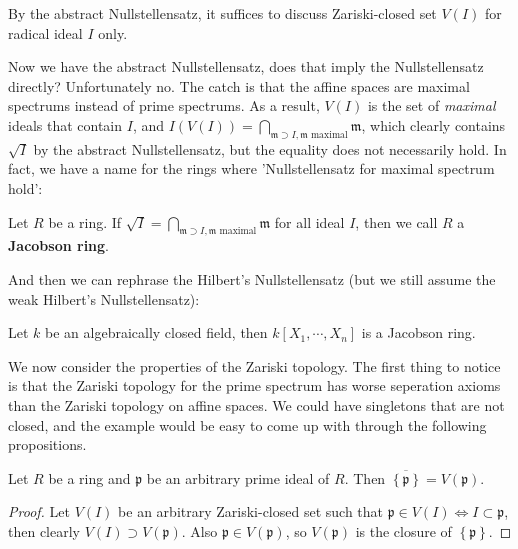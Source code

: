 \documentclass{note-eng}
\begin{document}
By the abstract Nullstellensatz, it suffices to discuss Zariski-closed set $V(I)$ for radical ideal $I$ only.

Now we have the abstract Nullstellensatz, does that imply the Nullstellensatz directly? Unfortunately no. The catch is that the affine spaces are maximal spectrums instead of prime spectrums. As a result, $V(I)$ is the set of \textit{maximal} ideals that contain $I$, and $I(V(I)) = \bigcap\limits_{\mathfrak{m} \supset I, \mathfrak{m} \text{ maximal}} \mathfrak{m}$, which clearly contains $\sqrt{I}$ by the abstract Nullstellensatz, but the equality does not necessarily hold. In fact, we have a name for the rings where 'Nullstellensatz for maximal spectrum hold':

\begin{definition}
    Let $R$ be a ring. If $\sqrt{I} = \bigcap\limits_{\mathfrak{m} \supset I, \mathfrak{m} \text{ maximal}} \mathfrak{m}$ for all ideal $I$, then we call $R$ a \textbf{Jacobson ring}.
\end{definition}

And then we can rephrase the Hilbert's Nullstellensatz (but we still assume the weak Hilbert's Nullstellensatz):

\begin{theorem}
    Let $k$ be an algebraically closed field, then $k[X_1, \cdots, X_n]$ is a Jacobson ring.
\end{theorem}

We now consider the properties of the Zariski topology. The first thing to notice is that the Zariski topology for the prime spectrum has worse seperation axioms than the Zariski topology on affine spaces. We could have singletons that are not closed, and the example would be easy to come up with through the following propositions.

\begin{proposition}
    Let $R$ be a ring and $\mathfrak{p}$ be an arbitrary prime ideal of $R$. Then $\overline{\left\lbrace \mathfrak{p} \right\rbrace} = V(\mathfrak{p})$.
\end{proposition}

\begin{proof}
    Let $V(I)$ be an arbitrary Zariski-closed set such that $\mathfrak{p} \in V(I) \Leftrightarrow I \subset \mathfrak{p}$, then clearly $V(I) \supset V(\mathfrak{p})$. Also $\mathfrak{p} \in V(\mathfrak{p})$, so $V(\mathfrak{p})$ is the closure of $\left\lbrace \mathfrak{p} \right\rbrace$.
\end{proof}
\end{document}
